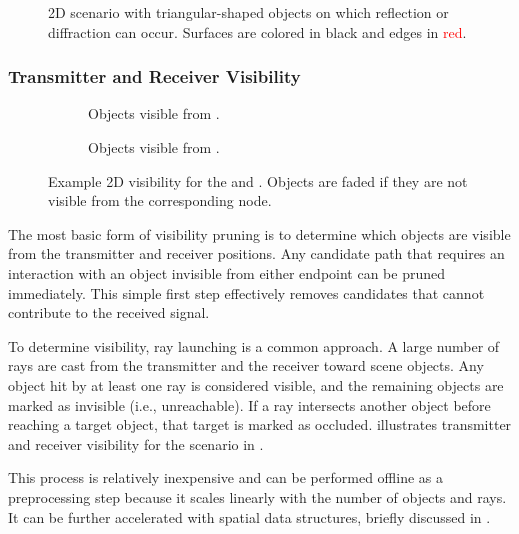 \begin{figure}
  \centering
  \caption{2D scenario with triangular-shaped objects on which reflection or diffraction can occur. Surfaces are colored in black and edges in \textcolor{red}{red}.}
\end{figure}

\subsubsection{Transmitter and Receiver Visibility}

\begin{figure}
  \centering
  \begin{subfigure}{0.49\contentwidth}
    \centering
    \caption{Objects visible from .}
  \end{subfigure}
  \begin{subfigure}{0.49\contentwidth}
    \centering
    \caption{Objects visible from .}
  \end{subfigure}
  \caption{Example 2D visibility for the  and . Objects are faded if they are not visible from the corresponding node.}
\end{figure}

The most basic form of visibility pruning is to determine which objects are visible from the transmitter and receiver positions. Any candidate path that requires an interaction with an object invisible from either endpoint can be pruned immediately. This simple first step effectively removes candidates that cannot contribute to the received signal.

To determine visibility, ray launching is a common approach. A large number of rays are cast from the transmitter and the receiver toward scene objects. Any object hit by at least one ray is considered visible, and the remaining objects are marked as invisible (i.e., unreachable). If a ray intersects another object before reaching a target object, that target is marked as occluded.  illustrates transmitter and receiver visibility for the scenario in .

This process is relatively inexpensive and can be performed offline as a preprocessing step because it scales linearly with the number of objects and rays. It can be further accelerated with spatial data structures, briefly discussed in .

